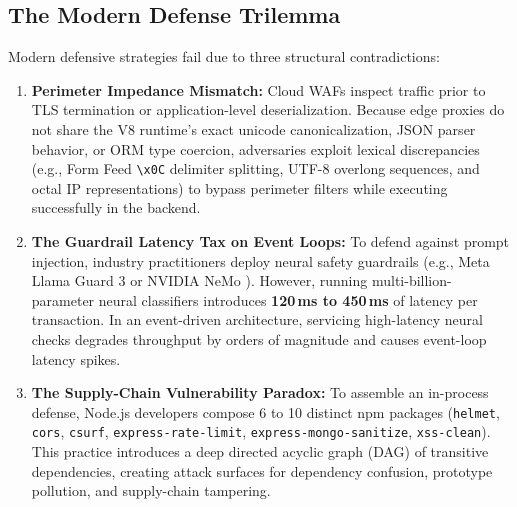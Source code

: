\documentclass[conference]{IEEEtran}
\begin{document}
\subsection{The Modern Defense Trilemma}
Modern defensive strategies fail due to three structural contradictions:
\begin{enumerate}
    \item \textbf{Perimeter Impedance Mismatch:} Cloud WAFs inspect traffic prior to TLS termination or application-level deserialization. Because edge proxies do not share the V8 runtime's exact unicode canonicalization, JSON parser behavior, or ORM type coercion, adversaries exploit lexical discrepancies (e.g., Form Feed \texttt{\textbackslash x0C} delimiter splitting, UTF-8 overlong sequences, and octal IP representations) to bypass perimeter filters while executing successfully in the backend.
    \item \textbf{The Guardrail Latency Tax on Event Loops:} To defend against prompt injection, industry practitioners deploy neural safety guardrails (e.g., Meta Llama Guard 3 \cite{inan2023llama} or NVIDIA NeMo \cite{rebedea2023nemo}). However, running multi-billion-parameter neural classifiers introduces \textbf{120\,ms to 450\,ms} of latency per transaction. In an event-driven architecture, servicing high-latency neural checks degrades throughput by orders of magnitude and causes event-loop latency spikes.
    \item \textbf{The Supply-Chain Vulnerability Paradox:} To assemble an in-process defense, Node.js developers compose 6 to 10 distinct npm packages (\texttt{helmet}, \texttt{cors}, \texttt{csurf}, \texttt{express-rate-limit}, \texttt{express-mongo-sanitize}, \texttt{xss-clean}). This practice introduces a deep directed acyclic graph (DAG) of transitive dependencies, creating attack surfaces for dependency confusion, prototype pollution, and supply-chain tampering.
\end{enumerate}
\end{document}
